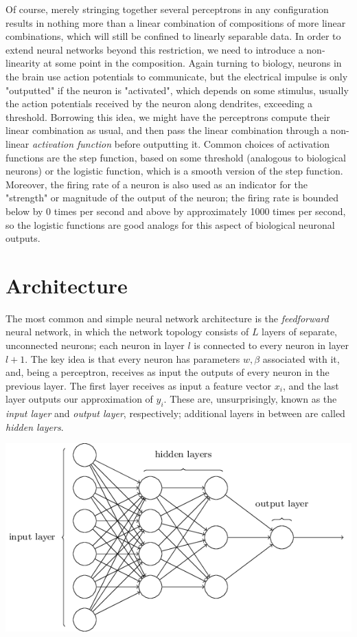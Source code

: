 \documentclass{article}
\begin{document}
Of course, merely stringing together several perceptrons in any configuration results in nothing more than a linear combination of compositions of more linear combinations, which will still be confined to linearly separable data. In order to extend neural networks beyond this restriction, we need to introduce a non-linearity at some point in the composition. Again turning to biology, neurons in the brain use action potentials to communicate, but the electrical impulse is only "outputted" if the neuron is "activated", which depends on some stimulus, usually the action potentials received by the neuron along dendrites, exceeding a threshold. Borrowing this idea, we might have the perceptrons compute their linear combination as usual, and then pass the linear combination through a non-linear \textit{activation function} before outputting it. Common choices of activation functions are the step function, based on some threshold (analogous to biological neurons) or the logistic function, which is a smooth version of the step function. Moreover, the firing rate of a neuron is also used as an indicator for the "strength" or magnitude of the output of the neuron; the firing rate is bounded below by 0 times per second and above by approximately 1000 times per second, so the logistic functions are good analogs for this aspect of biological neuronal outputs.

\section{Architecture}
The most common and simple neural network architecture is the \textit{feedforward} neural network, in which the network topology consists of $ L $ layers of separate, unconnected neurons; each neuron in layer $ l $ is connected to every neuron in layer $ l + 1 $. The key idea is that every neuron has parameters $ w, \beta $ associated with it, and, being a perceptron, receives as input the outputs of every neuron in the previous layer. The first layer receives as input a feature vector $ x_i $, and the last layer outputs our approximation of $ y_i $. These are, unsurprisingly, known as the \textit{input layer} and \textit{output layer}, respectively; additional layers in between are called \textit{hidden layers}.

\begin{center}
    \includegraphics[scale=0.5]{images/neural_network.png}
\end{center}    
\end{document}
